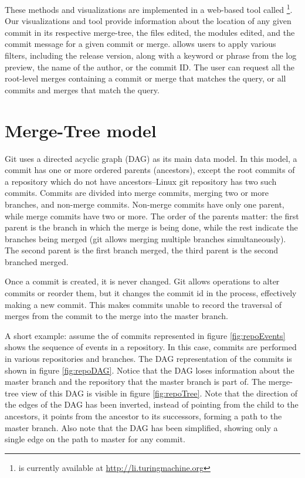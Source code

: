 \documentclass[conference, draftclsnofoot, draft]{IEEEtran}
\begin{document}
These methods and visualizations are implemented in a web-based tool called
\tool\footnote{\tool is currently available at \url{http://li.turingmachine.org}}.
Our visualizations and tool provide information about the location of any given
commit in its respective merge-tree, the files edited, the modules edited, and the
commit message for a given commit or merge. \tool allows users to apply various
filters, including the release version, along with a keyword or phrase from the log
preview, the name of the author, or the commit ID. The user can request all the
root-level merges containing a commit or merge that matches the query, or all
commits and merges that match the query.

\section{Merge-Tree model}
\label{sec:mergetree}

Git uses a directed acyclic graph (DAG) as its main data model. In this model, a
commit has one or more ordered parents (ancestors), except the root commits of a
repository which do not have ancestors--Linux git repository has two such commits.
Commits are divided into merge commits, merging two or more branches, and non-merge
commits. Non-merge commits have only one parent, while merge commits have two or
more. The order of the parents matter: the first parent is the branch in which the
merge is being done, while the rest indicate the branches being merged (git allows
merging multiple branches simultaneously). The second parent is the first branch
merged, the third parent is the second branched merged.

Once a commit is created, it is never changed. Git allows operations to alter
commits or reorder them, but it changes the commit id in the process, effectively
making a new commit. This makes commits unable to record the traversal of merges
from the commit to the merge into the master branch.

A short example: assume the of commits represented in figure \ref{fig:repoEvents}
shows the sequence of events in a repository. In this case, commits are performed in
various repositories and branches. The DAG representation of the commits is shown in
figure \ref{fig:repoDAG}. Notice that the DAG loses information about the master
branch and the repository that the master branch is part of. The merge-tree view of
this DAG is visible in figure \ref{fig:repoTree}. Note that the direction of the
edges of the DAG has been inverted, instead of pointing from the child to the
ancestors, it points from the ancestor to its successors, forming a path to the
master branch. Also note that the DAG has been simplified, showing only a single
edge on the path to master for any commit.
\end{document}
